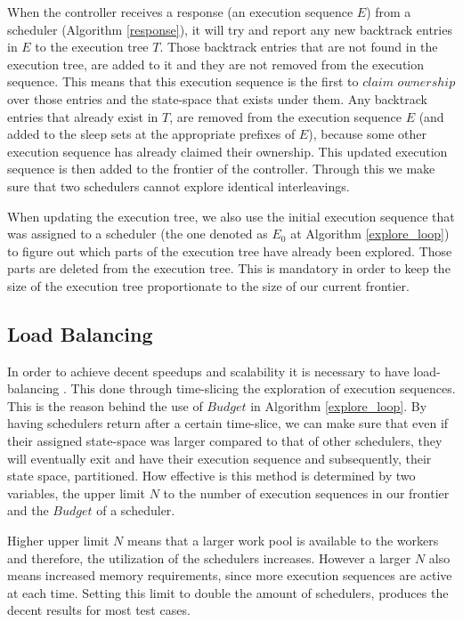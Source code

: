 When the controller receives a response (an execution sequence $E$) from a scheduler (Algorithm \ref{response}), it will 
try and report any new
backtrack entries in $E$ to the execution tree $T$. Those backtrack entries that are not found
in the execution tree, are added to it and they are not removed from the execution sequence. This means that 
this execution sequence is the first to $claim$ $ownership$ over those entries and the state-space
that exists under them. Any backtrack entries that already exist in $T$, are removed from the 
execution sequence $E$ (and added to the sleep sets at the appropriate prefixes of $E$),
because some other execution sequence has already claimed their ownership. This updated execution sequence is then 
added to the frontier of the controller. Through this we make sure that two schedulers cannot explore identical
interleavings.

When updating the execution tree, we also use the initial execution sequence that was assigned to a scheduler
(the one denoted as $E_0$ at Algorithm \ref{explore_loop}) to figure out which parts of the execution tree have
already been explored. Those parts are deleted from the execution tree. 
This is mandatory in order to keep the size of the execution tree proportionate to the size of our current frontier.


\subsection{Load Balancing}

In order to achieve decent speedups and scalability it is necessary to have load-balancing \cite{Simsa2012ScalableDP}.
This done through time-slicing \cite{wiki:timeslice} the exploration of execution sequences. This is the reason
behind the use of $Budget$ in Algorithm \ref{explore_loop}. By having schedulers return after a certain time-slice,
we can make sure that even if their assigned state-space was larger compared to that of other schedulers, they will
eventually exit and have their execution sequence and subsequently, their state space, partitioned. How effective
is this method is determined by two variables, the upper limit $N$ to the number of execution sequences in our
frontier and the $Budget$ of a scheduler.

Higher upper limit $N$ means that a larger work pool is available to the workers and therefore, the utilization of the schedulers
increases.
However a larger $N$ also means increased memory requirements, since more execution sequences are active at each time.
Setting this limit to double the amount of schedulers, produces the decent results for most test cases\cite{Simsa2012ScalableDP}.

